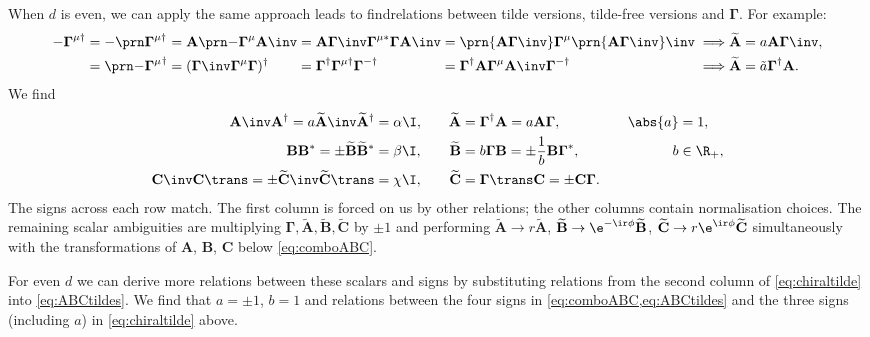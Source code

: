 \documentclass[11pt]{article}
\newcommand{\invd}{^{-\dag}}
\newcommand{\Gammab}{\boldsymbol{\Gamma}}
\newcommand{\mud}{{\mu\dag}}
\newcommand{\muc}{{\mu\ast}}
\newcommand{\A}{\mathbf{A}}
\newcommand{\B}{\mathbf{B}}
\renewcommand{\C}{\mathbf{C}}
\newcommand{\At}{\widetilde{\A}}
\newcommand{\Bt}{\widetilde{\B}}
\newcommand{\Ct}{\widetilde{\C}}
\begin{document}
When $d$ is even, we can apply the same approach leads to findrelations between tilde versions, tilde-free versions and $\Gammab$.
For example:
%
\begin{equation*}
\begin{alignedat}{6}
  -\Gammab^\mud 
    &= -\Gammap[\mud] &
    &= \A \Gammap*[\mu] \A\inv &
    &= \A \Gammab\inv \Gammab^\muc \Gammab \A\inv &
    &= \prn{\A \Gammab\inv} \Gammab^\mu \prn{\A \Gammab\inv}\inv &
    &\implies &
  \At &= a \A \Gammab\inv, \\
    &= \Gammap*[\mu]^\dag &
    &= (\Gammab\inv \Gammab^\mu \Gammab)^\dag &
    &= \Gammab^\dag \Gammab^\mud \Gammab\invd &
    &= \Gammab^\dag \A \Gammab^\mu \A\inv \Gammab\invd &
    &\implies &
  \At &= \tilde{a} \Gammab^\dag \A. \\
\end{alignedat}
\end{equation*}
%
We find
%
\begin{equation}\label{eq:chiraltilde}
\begin{aligned}
  \A\inv \A^\dag = a \At\inv \At^\dag &= \alpha \I, &\quad
  \At &= \Gammab^\dag \A = a \A \Gammab,            &\quad
  \abs{a} &= 1,                                         \\
  \B \B^\ast = \pm \Bt \Bt^\ast &= \beta \I,             &
  \Bt &= b \Gammab \B = \pm \frac{1}{b} \B \Gammab^\ast, &
  b &\in \R_+,                                       \\
  \C\inv \C\trans = \pm \Ct\inv \Ct\trans &= \chi \I,    &
  \Ct &= \Gammab\trans \C = \pm \C \Gammab.              &
\end{aligned}
\end{equation}
%
The signs across each row match.
The first column is forced on us by other relations; the other columns contain normalisation choices.
The remaining scalar ambiguities are multiplying $\Gammab,\At,\Bt,\Ct$ by $\pm1$
and performing \( \At \rightarrow r \At \), \( \Bt \rightarrow \e^{-\ir\phi} \Bt \),
\( \Ct \rightarrow r\e^{\ir\phi} \Ct \) simultaneously with the transformations of $\A$, $\B$, $\C$ below \cref{eq:comboABC}.

For even $d$ we can derive more relations between these scalars and signs by substituting relations from the second column of \cref{eq:chiraltilde} into \cref{eq:ABCtildes}.
We find that \(a = \pm 1\), \(b = 1\) and relations between the four signs in \cref{eq:comboABC,eq:ABCtildes} and the three signs (including \(a\)) in \cref{eq:chiraltilde} above.
\end{document}
